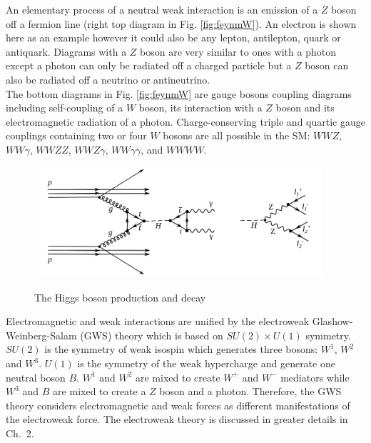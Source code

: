 An elementary process of a neutral weak interaction is an emission of a $Z$ boson off a fermion line (right top diagram in Fig. \ref{fig:feynmW}). An electron is shown here as an example however it could also be any lepton, antilepton, quark or antiquark. Diagrams with a $Z$ boson are very similar to ones with a photon except a photon can only be radiated off a charged particle but a $Z$ boson can also be radiated off a neutrino or antineutrino.\\

The bottom diagrams in Fig. \ref{fig:feynmW} are gauge bosons coupling diagrams including self-coupling of a $W$ boson, its interaction with a $Z$ boson and its electromagnetic radiation of a photon. Charge-conserving triple and quartic gauge couplings containing two or four $W$ bosons are all possible in the SM: $WWZ$, $WW\gamma$, $WWZZ$, $WWZ\gamma$, $WW\gamma\gamma$, and $WWWW$.\\

\begin{figure}[htb]
  \begin{center}
    {\includegraphics[width=0.95\textwidth]{../figs/Intro/FeynmanHiggs.png}}
    \caption{The Higgs boson production and decay}
    \label{fig:higgsProduction}
  \end{center}
\end{figure}

Electromagnetic and weak interactions are unified by the electroweak Glashow-Weinberg-Salam (GWS) theory which is based on $SU(2) \times U(1)$ symmetry. $SU(2)$ is the symmetry of weak isospin which generates three bosons: $W^1$, $W^2$ and $W^3$. $U(1)$ is the symmetry of the weak hypercharge and generate one neutral boson $B$. $W^1$ and $W^2$ are mixed to create $W^+$ and $W^-$ mediators while $W^3$ and $B$ are mixed to create a $Z$ boson and a photon. Therefore, the GWS theory considers electromagnetic and weak forces as different manifestations of the electroweak force. The electroweak theory is discussed in greater details in Ch.~2.\\


